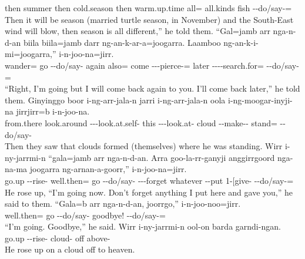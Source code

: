 \begin{exye}
then summer then cold.season then warm.up.time all= all.kinds  fish --do/say-=\\
\ft Then it will be  season (married turtle season, in November) and the South-East wind will blow, then  season is all different,'' he told them.
\exy {}
\gll ``Gal=jamb arr nga-n-d-an biila biila=jamb darr ng-an-k-ar-a=joogarra. Laamboo ng-an-k-i-mi=joogarra,'' i-n-joo-na=jirr.\\
wander= go --do/say- again also= come ---pierce-= later ----search.for= --do/say-=\\
\ft ``Right, I'm going but I will come back again to you. I'll come back later,'' he told them.
\exy {}
\gll Ginyinggo boor i-ng-arr-jala-n jarri i-ng-arr-jala-n oola i-ng-moogar-inyji-na jirrjirr=b i-n-joo-na.\\
from.there look.around ---look.at.self-  this ---look.at- cloud --make-- stand= --do/say-\\
\ft Then they saw that clouds formed (themselves) where he was standing.
\exy {}
\gll Wirr i-ny-jarrmi-n ``gala=jamb arr nga-n-d-an. Arra goo-la-rr-ganyji anggirrgoord nga-na-ma joogarra ng-arnan-a-goorr,'' i-n-joo-na=jirr.\\
go.up --rise- well.then= go --do/say-  ---forget whatever --put  1-[give- --do/say-=\\
\ft He rose up, ``I'm going now. Don't forget anything I put here and gave you,'' he said to them.
\exy {}
\gll ``Gala=b arr nga-n-d-an, joorrgo,'' i-n-joo-noo=jirr.\\
well.then= go --do/say- goodbye! --do/say-=\\
\ft ``I'm going. Goodbye,'' he said.
\exy {}
\gll Wirr i-ny-jarrmi-n ool-on barda garndi-ngan.\\
go.up --rise- cloud- off above-\\
\ft He rose up on a cloud off to heaven.
\end{exye}

